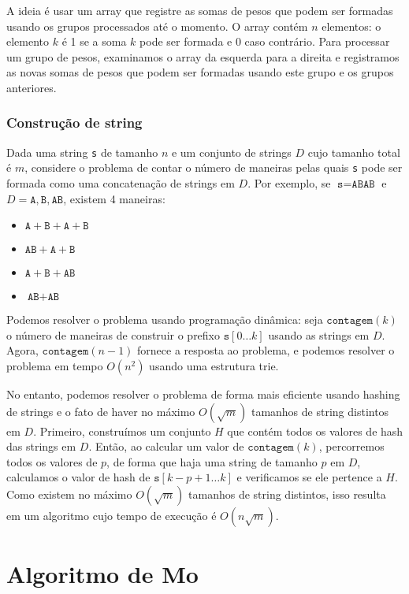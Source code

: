 A ideia é usar um array que registre as somas de pesos
que podem ser formadas usando os grupos processados até o momento.
O array contém $n$ elementos: o elemento $k$ é 1 se a soma
$k$ pode ser formada e 0 caso contrário.
Para processar um grupo de pesos, examinamos o array
da esquerda para a direita e registramos as novas somas de pesos que
podem ser formadas usando este grupo e os grupos anteriores.

\subsubsection{Construção de string}

Dada uma string \texttt{s} de tamanho $n$
e um conjunto de strings $D$ cujo tamanho total é $m$,
considere o problema de contar o número de maneiras
pelas quais \texttt{s} pode ser formada como uma concatenação de strings em $D$.
Por exemplo,
se $\texttt{s}=\texttt{ABAB}$ e
$D={\texttt{A},\texttt{B},\texttt{AB}}$,
existem 4 maneiras:

\begin{itemize}[noitemsep]
\item $\texttt{A}+\texttt{B}+\texttt{A}+\texttt{B}$
\item $\texttt{AB}+\texttt{A}+\texttt{B}$
\item $\texttt{A}+\texttt{B}+\texttt{AB}$
\item $\texttt{AB}+\texttt{AB}$
\end{itemize}

Podemos resolver o problema usando programação dinâmica:
seja $\texttt{contagem}(k)$ o número de maneiras de construir o prefixo
$\texttt{s}[0 \ldots k]$ usando as strings em $D$.
Agora, $\texttt{contagem}(n-1)$ fornece a resposta ao problema,
e podemos resolver o problema em tempo $O(n^2)$
usando uma estrutura trie.

No entanto, podemos resolver o problema de forma mais eficiente
usando hashing de strings e o fato de haver
no máximo $O(\sqrt m)$ tamanhos de string distintos em $D$.
Primeiro, construímos um conjunto $H$ que contém todos
os valores de hash das strings em $D$.
Então, ao calcular um valor de $\texttt{contagem}(k)$,
percorremos todos os valores de $p$,
de forma que haja uma string de tamanho $p$ em $D$,
calculamos o valor de hash de $\texttt{s}[k-p+1 \ldots k]$
e verificamos se ele pertence a $H$.
Como existem no máximo $O(\sqrt m)$ tamanhos de string distintos,
isso resulta em um algoritmo cujo tempo de execução é $O(n \sqrt m)$.

\section{Algoritmo de Mo}

